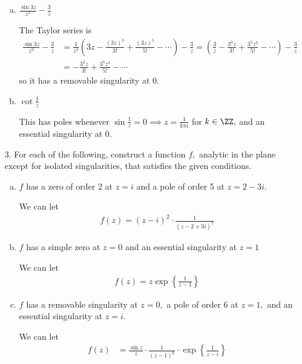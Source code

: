\documentclass{article}
\begin{document}
\begin{itemize}
\begin{enumerate}[(a)]
			\item $\frac{\sin 3z}{z^2}-\frac{3}{z}$
				\begin{soln}
					The Taylor series is
					\begin{align*}
						\frac{\sin 3z}{z^2} - \frac{3}{z} &= \frac{1}{z^2}\left( 3z - \frac{(3z)^3}{3!} + \frac{(3z)^5}{5!} - \cdots \right) - \frac{3}{z} = \left(\frac{3}{z} - \frac{3^3z}{3!} + \frac{3^5z^3}{5!} - \cdots \right)  - \frac{3}{z} \\
						&= -\frac{3^3z}{3!} + \frac{3^5z^3}{5!} - \cdots
					\end{align*}
					so it has a removable singularity at 0.
				\end{soln}

			\item $\cot\frac{1}{z}$
				\begin{soln}
					This has poles whenever $\sin \frac{1}{z} = 0\implies z = \frac{1}{k\pi i}$ for $k\in\ZZ,$ and an essential singularity at 0.
				\end{soln}
				
		\end{enumerate}

	\item[3.] For each of the following, construct a function $f,$ analytic in the plane except for isolated singularities, that satisfies the given conditions.
		\begin{enumerate}[(a)]
			\item $f$ has a zero of order 2 at $z=i$ and a pole of order 5 at $z=2-3i.$
				\begin{soln}
					We can let
					\begin{align*}
						f(z) = (z-i)^2\cdot \frac{1}{(z-2+3i)^5}
					\end{align*}
				\end{soln}

			\item $f$ has a simple zero at $z=0$ and an essential singularity at $z=1$
				\begin{soln}
					We can let
					\begin{align*}
						f(z) = z\exp\left\{ \frac{1}{z-1} \right\}
					\end{align*}
				\end{soln}

			\item $f$ has a removable singularity at $z=0,$ a pole of order 6 at $z=1,$ and an essential singularity at $z=i.$
				\begin{soln}
					We can let
					\begin{align*}
						f(z) &= \frac{\sin z}{z}\cdot \frac{1}{(z-1)^6}\cdot \exp\left\{ \frac{1}{z-i} \right\}
					\end{align*}
				\end{soln}


\end{enumerate}
\end{itemize}
\end{document}
